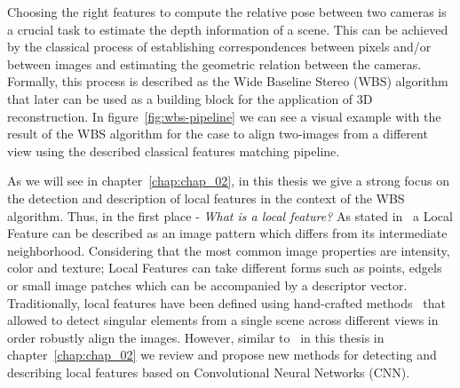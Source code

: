 Choosing the right features to compute the relative pose between two cameras is a crucial task to estimate the depth information of a scene. This can be achieved by the classical process of establishing correspondences between pixels and/or between images and estimating the geometric relation between the cameras. Formally, this process is described as the Wide Baseline Stereo (WBS) algorithm~\cite{Schmid95matchingby} that later can be used as a building block for the application of 3D reconstruction. In figure~\ref{fig:wbs-pipeline} we can see a visual example with the result of the WBS algorithm for the case to align two-images from a different view using the described classical features matching pipeline.

As we will see in chapter~\ref{chap:chap_02}, in this thesis we give a strong focus on the detection and description of local features in the context of the WBS algorithm. Thus, in the first place - \textit{What is a local feature?} As stated in~\citep{tuytelaars2008local} a Local Feature can be described as an image pattern which differs from its intermediate neighborhood. Considering that the most common image properties are intensity, color and texture; Local Features can take different forms such as points, edgels or small image patches which can be accompanied by a descriptor vector. Traditionally, local features have been defined using hand-crafted methods~\cite{SIFT, ORB} that allowed to detect singular elements from a single scene across different views in order robustly align the images. However, similar to~\cite{ZagoruykoCVPR2015, detone2017superpoint} in this thesis in chapter~\ref{chap:chap_02} we review and propose new methods for detecting and describing local features based on Convolutional Neural Networks (CNN).


